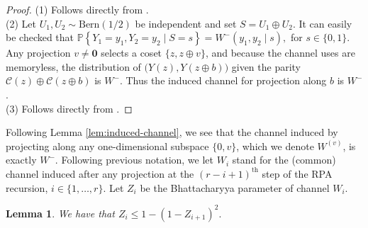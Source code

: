\documentclass[conference,letterpaper]{IEEEtran}
\newcommand{\bits}{\left\{0,1\right\}}
\newcommand{\cC}{\ensuremath{\mathcal{C}}}
\newcommand{\cY}{\mathcal{Y}}
\newcommand{\PR}[1]{{\mathbb{P}}\left\{ #1\right\}}
\newtheorem{lemma}[theorem]{Lemma}
\begin{document}
\begin{proof}
  (1) Follows directly from \cite[Prop. 13]{polar}.\\
(2)  Let \(U_1,U_2\sim\mathrm{Bern}(1/2)\) be independent and set \(S=U_1\oplus U_2\).  It can easily be checked that $\PR{Y_1=y_1,Y_2=y_2 \mid S=s} = W^-(y_1,y_2 \mid s),$ for $s\in \{0,1\}$.
Any projection \(v\neq \mathbf{0}\) selects a coset \(\{z,z\oplus v\}\), and because the channel uses are memoryless, the distribution of \(\bigl(Y(z),Y(z\oplus b)\bigr)\) given the parity \(\cC(z)\oplus \cC(z\oplus b)\) is \(W^-\).  Thus the induced channel for projection along \(b\) is \(W^-\).
\\
(3)  Follows directly from \cite[Prop. 5]{polar}.
\end{proof}
Following Lemma \ref{lem:induced-channel}, we see that the channel induced by projecting along any one-dimensional subspace \(\{0,v\}\), which we denote $W^{(v)}$, is exactly \(W^-\). Following previous notation, we let $W_i$ stand for the (common) channel induced after any projection at the $(r-i+1)^\text{th}$ step of the RPA recursion, $i\in \{1,\ldots,r\}$. Let $ Z_i$ be the Bhattacharyya parameter of channel $W_i$.
\begin{lemma}\label{lem:bhat-rec} 
    We have that $Z_i \leq 1- ( 1- Z_{i+1})^2.$
        
\end{lemma}
\end{document}
